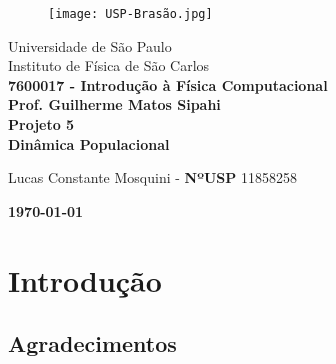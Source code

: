 \documentclass[a4paper, 12pt]{article}
\begin{document}

\begin{titlepage}

\begin{figure}[H]
    \centering
    \texttt{[image: USP-Brasão.jpg]}
    \label{brasaoUSP}
\end{figure}

\begin{center} 
    {\large Universidade de São Paulo}\\[0.1cm] 
    {\large Instituto de Física de São Carlos}\\[1.5cm]
    {\large \textbf{7600017 - Introdução à Física Computacional}}\\[0.1cm]
    {\large \textbf{Prof.  Guilherme Matos Sipahi}}\\[2.2cm]
    {\Huge \textbf{Projeto 5}}\\ [2.0cm]
    {\Huge \textbf{Dinâmica Populacional}} \\ [3.0cm]
\end{center}

\begin{center}{\large}
    {\large Lucas Constante Mosquini - \textbf{NºUSP} 11858258}\\[0.1cm]
\end{center}
\hfill
\begin{center}
{\large \textbf{\today}}\\
\end{center}

\end{titlepage}




\setlength{\columnseprule}{0.5pt}
\def\columnseprulecolor{\color{\black}}

\tableofcontents

\newpage


\section{Introdução}


\subsection{Agradecimentos}
\end{document}
